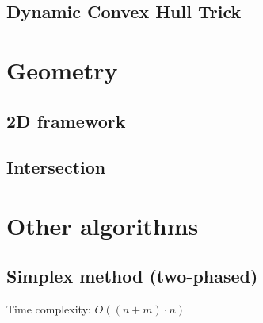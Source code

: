 \documentclass[10pt]{article}
\begin{document}
\subsection{Dynamic Convex Hull Trick}


\section{Geometry}
\subsection{2D framework}

\subsection{Intersection}

\section{Other algorithms}
\subsection{Simplex method (two-phased)}
Time complexity: $O((n + m) \cdot n)$

\end{document}
